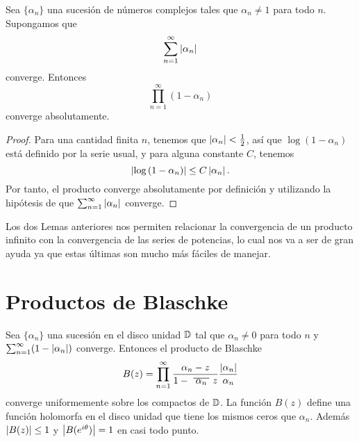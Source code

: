 \begin{lemma}
    \label{th:convergencia}
    Sea $\{\alpha_n\}$ una sucesión de números complejos tales que $\alpha_n \not = 1$ para todo $n$. Supongamos que
    \begin{equation*}
        \sum_{n=1}^{\infty} \left\lvert\alpha_n\right\rvert
    \end{equation*}
    converge. Entonces
    \begin{equation*}
        \prod_{n=1}^{\infty} (1 - \alpha_n)
    \end{equation*}
    converge absolutamente.
\end{lemma}

\begin{proof}
    Para una cantidad finita $n$, tenemos que $\left\lvert\alpha_n\right\rvert < \frac{1}{2}$, así que $\log{(1 - \alpha_n)}$ está definido por la serie usual, y para alguna constante $C$, tenemos
    \begin{equation*}
        \left\lvert\log{(1 - \alpha_n)}\right\rvert \leq C \left\lvert\alpha_n\right\rvert.
    \end{equation*}
    Por tanto, el producto converge absolutamente por definición y utilizando la hipótesis de que $\sum_{n=1}^{\infty} \left\lvert\alpha_n\right\rvert$ converge.
\end{proof}

Los dos Lemas anteriores nos permiten relacionar la convergencia de un producto infinito con la convergencia de las series de potencias, lo cual nos va a ser de gran ayuda ya que estas últimas son mucho más fáciles de manejar. \\


\section{Productos de Blaschke}


\begin{prop}
    Sea $\{\alpha_n\}$ una sucesión en el disco unidad $\mathbb{D}$ tal que $\alpha_n \not = 0$ para todo $n$ y $\sum_{n=1}^{\infty} (1 - \left\lvert\alpha_n\right\rvert)$ converge. Entonces el producto de Blaschke
    \begin{equation*}
        B(z) = \prod_{n=1}^{\infty} \frac{\alpha_n - z}{1 - \xbar{\alpha_n}z} \dfrac{\abs{\alpha_n}}{\alpha_n}
    \end{equation*}
    converge uniformemente sobre los compactos de $\mathbb{D}$. La función $B(z)$ define una función holomorfa en el disco unidad que tiene los mismos ceros que $\alpha_n$. Además $\left\lvert B(z)\right\rvert \leq 1$ y $\left\lvert B(e^{i \theta})\right\rvert = 1$ en casi todo punto.
\end{prop}

